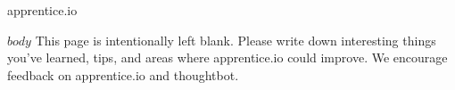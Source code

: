 \documentclass{book}
\begin{document}


  \vspace*{\fill}
    \begin{center}
      {\Huge apprentice.io}
    \end{center}
  \vspace*{\fill}

  \clearpage

  \setcounter{page}{0}


  $body$
  \clearpage
  This page is intentionally left blank. Please write down interesting things
  you've learned, tips, and areas where apprentice.io could improve. We encourage
  feedback on apprentice.io and thoughtbot.
\end{document}
